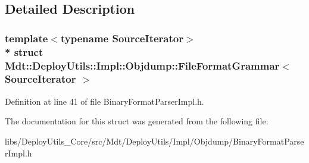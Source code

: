 \subsection{Detailed Description}
\subsubsection*{template$<$typename Source\+Iterator$>$\\*
struct Mdt\+::\+Deploy\+Utils\+::\+Impl\+::\+Objdump\+::\+File\+Format\+Grammar$<$ Source\+Iterator $>$}



Definition at line 41 of file Binary\+Format\+Parser\+Impl.\+h.



The documentation for this struct was generated from the following file\+:\begin{DoxyCompactItemize}
\item 
libs/\+Deploy\+Utils\+\_\+\+Core/src/\+Mdt/\+Deploy\+Utils/\+Impl/\+Objdump/Binary\+Format\+Parser\+Impl.\+h\end{DoxyCompactItemize}
